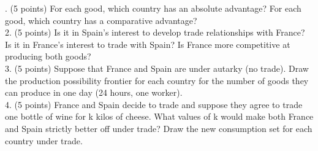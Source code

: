 \documentclass{article}
\begin{document}
. (5 points) For each good, which country has an absolute advantage? For each good, which country has a comparative advantage? \\
2. (5 points) Is it in Spain’s interest to develop trade relationships with France? Is it in France’s interest to trade with Spain? Is France more competitive at producing both goods? \\
3. (5 points) Suppose that France and Spain are under autarky (no trade). Draw the production possibility frontier for each country for the number of goods they can produce in one day (24 hours, one worker). \\
4. (5 points) France and Spain decide to trade and suppose they agree to trade one bottle of wine for k kilos of cheese. What values of k would make both France and Spain strictly better off under trade? Draw the new consumption set for each country under trade. \\
\end{document}
